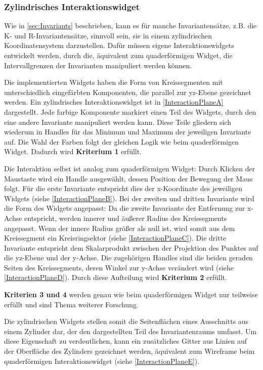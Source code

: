 \documentclass[a4paper,fontsize=12pt,toc=bib,parskip=half,ngerman]{scrartcl}
\begin{document}
\subsubsection{Zylindrisches Interaktionswidget}
Wie in \cref{sec:Invariants} beschrieben, kann es f\"ur manche Invariantens\"atze, z.B. die K- und R-Invariantens\"atze, sinnvoll sein, sie in einem zylindrischen Koordinatensystem darzustellen. Daf\"ur m\"ussen eigene Interaktionswidgets entwickelt werden, durch die, \"aquivalent zum quaderf\"ormigen Widget, die Intervallgrenzen der Invarianten manipuliert werden k\"onnen.

Die implementierten Widgets haben die Form von Kreissegmenten mit unterschiedlich eingef\"arbten Komponenten, die parallel zur yz-Ebene gezeichnet werden. Ein zylindrisches Interaktionswidget ist in \cref{InteractionPlaneA} dargestellt. Jede farbige Komponente markiert einen Teil des Widgets, durch den eine andere Invariante manipuliert werden kann. Diese Teile gliedern sich wiederum in Handles f\"ur das Minimum und Maximum der jeweiligen Invariante auf. Die Wahl der Farben folgt der gleichen Logik wie beim quaderf\"ormigen Widget. Dadurch wird \textbf{Kriterium 1} erf\"ullt.

Die Interaktion selbst ist analog zum quaderf\"ormigen Widget: Durch Klicken der Maustaste wird ein Handle ausgew\"ahlt, dessen Position der Bewegung der Maus folgt. F\"ur die erste Invariante entspricht dies der x-Koordinate des jeweiligen Widgets (siehe \cref{InteractionPlaneB}). Bei der zweiten und dritten Invariante wird die Form des Widgets angepasst: Da die zweite Invariante der Entfernung zur x-Achse entspricht, werden innerer und \"au{\ss}erer Radius des Kreissegments angepasst. Wenn der innere Radius gr\"o{\ss}er als null ist, wird somit aus dem Kreissegment ein Kreisringsektor (siehe \cref{InteractionPlaneC}). Die dritte Invariante entspricht dem Skalarprodukt zwischen der Projektion des Punktes auf die yz-Ebene und der y-Achse. Die zugeh\"origen Handles sind die beiden geraden Seiten des Kreissegments, deren Winkel zur y-Achse ver\"andert wird (siehe \cref{InteractionPlaneD}). Durch diese Aufteilung wird \textbf{Kriterium 2} erf\"ullt.

\textbf{Kriterien 3 und 4} werden genau wie beim quaderf\"ormigen Widget nur teilweise erf\"ullt und sind Thema weiterer Forschung.

Die zylindrischen Widgets stellen somit die Seitenfl\"achen eines Ausschnitts aus einem Zylinder dar, der den dargestellten Teil des Invariantenraums umfasst. Um diese Eigenschaft zu verdeutlichen, kann ein zus\"atzliches Gitter aus Linien auf der Oberfl\"ache des Zylinders gezeichnet werden, \"aquivalent zum Wireframe beim quaderf\"ormigen Interaktionswidget (siehe \cref{InteractionPlaneE}).
\end{document}
